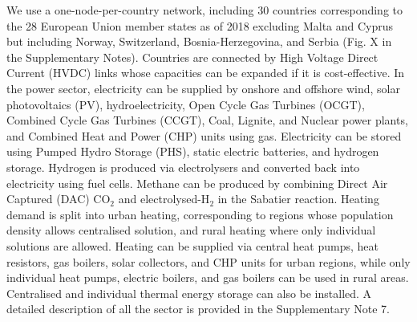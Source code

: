 \documentclass[5p]{elsarticle} %
\begin{document}
We use a one-node-per-country network, including 30 countries corresponding to the 28 European Union member states as of 2018 excluding Malta and Cyprus but including Norway, Switzerland, Bosnia-Herzegovina, and Serbia (Fig. \textcolor[rgb]{1,0,0}{X} in the Supplementary Notes). Countries are connected by High Voltage Direct Current (HVDC) links whose capacities can be expanded if it is cost-effective. In the power sector, electricity can be supplied by onshore and offshore wind, solar photovoltaics (PV), hydroelectricity, Open Cycle Gas Turbines (OCGT), Combined Cycle Gas Turbines (CCGT), Coal, Lignite, and Nuclear power plants, and Combined Heat and Power (CHP) units using gas. Electricity can be stored using Pumped Hydro Storage (PHS), static electric batteries, and hydrogen storage. Hydrogen is produced via electrolysers and converted back into electricity using fuel cells. Methane can be produced by combining Direct Air Captured (DAC) CO$_2$ and electrolysed-H$_2$ in the Sabatier reaction.  
Heating demand is split into urban heating, corresponding to regions whose population density allows centralised solution, and rural heating where only individual solutions are allowed. Heating can be supplied via central heat pumps, heat resistors, gas boilers, solar collectors, and CHP units for urban regions, while only individual heat pumps, electric boilers, and gas boilers can be used in rural areas. Centralised and individual thermal energy storage can also be installed. A detailed description of all the sector is provided in the Supplementary Note 7. \
\end{document}
